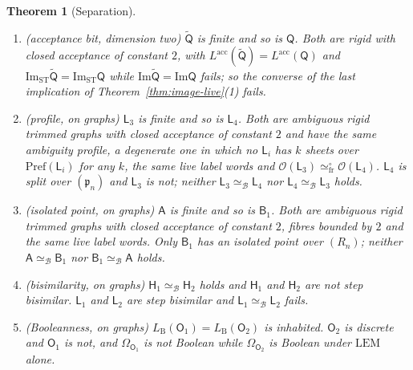 \documentclass{lmcs}
\newtheorem{theorem}{Theorem}[section]
\theoremstyle{definition}
\theoremstyle{remark}
\newcommand{\Op}{\mathcal{O}}
\newcommand{\prin}[1]{\mathrm{#1}}
\newcommand{\EM}{\prin{LEM}}
\newcommand{\Pref}{\mathrm{Pref}}
\newcommand{\eqFrF}{\simeq^{\circ}_{\mathrm{fr}}}
\providecommand{\LB}[1]{L_{\mathrm{B}}(#1)}
\providecommand{\dsum}{\sqcup}
\providecommand{\KA}{\mathsf{A}}
\providecommand{\KB}[1]{\mathsf{B}_{#1}}
\providecommand{\LangA}[1]{L^{\mathrm{acc}}(#1)}
\providecommand{\wQ}{\mathsf{Q}}
\providecommand{\eqB}{\simeq_{\mathcal{B}}}
\providecommand{\Ima}{\mathrm{Im}}
\providecommand{\ImaST}{\mathrm{Im}_{\mathrm{ST}}}
\providecommand{\dsum}{\sqcup}
\providecommand{\wQ}{\mathsf{Q}}
\providecommand{\wQt}{\tilde{\mathsf{Q}}}
\begin{document}
\begin{theorem}[Separation]
\begin{enumerate}[nosep]
  $\wQ\dsum \wQ\eqB \wQ^{(4)}$ fails.
\item (\emph{acceptance bit, dimension two}) $\wQt$ is finite and so is
  $\wQ$. Both are rigid with closed acceptance of constant $2$, with $\LangA{\wQt}=\LangA{\wQ}$ and $\ImaST\wQt=\ImaST \wQ$ while $\Ima\wQt=\Ima \wQ$ fails; so the converse of the
  last implication of Theorem~\ref{thm:image-live}(1) fails.
\item (\emph{profile, on graphs}) $\mathsf L_3$ is finite and so is
  $\mathsf L_4$. Both are ambiguous rigid trimmed graphs with closed acceptance of constant $2$ and have the same
  ambiguity profile, a degenerate one in which no $\mathsf L_i$ has $k$ sheets over $\Pref(\mathsf L_i)$ for any
  $k$, the same live label words and $\Op(\mathsf L_3)\eqFrF\Op(\mathsf L_4)$. $\mathsf L_4$ is split over
  $(\mathfrak p_n)$ and $\mathsf L_3$ is not; neither
  $\mathsf L_3\eqB\mathsf L_4$ nor $\mathsf L_4\eqB\mathsf L_3$ holds.
\item (\emph{isolated point, on graphs}) $\KA$ is finite and so is
  $\KB{1}$. Both are ambiguous rigid trimmed graphs with closed acceptance of constant $2$, fibres bounded by $2$ and the same live label words. Only $\KB{1}$ has an isolated point over
  $(R_n)$; neither $\KA\eqB\KB{1}$ nor $\KB{1}\eqB\KA$ holds.
\item (\emph{bisimilarity, on graphs}) $\mathsf H_1\eqB\mathsf H_2$ holds and $\mathsf H_1$ and $\mathsf H_2$ are
  not step bisimilar. $\mathsf L_1$ and $\mathsf L_2$ are step bisimilar and $\mathsf L_1\eqB\mathsf L_2$
  fails.
\item (\emph{Booleanness, on graphs}) $\LB{\mathsf O_1}=\LB{\mathsf O_2}$ is inhabited. $\mathsf O_2$ is discrete and
  $\mathsf O_1$ is not, and $\Omega_{\mathsf O_1}$ is not Boolean while $\Omega_{\mathsf O_2}$ is Boolean under $\EM$
  alone.
\end{enumerate}
\end{theorem}
\end{document}
